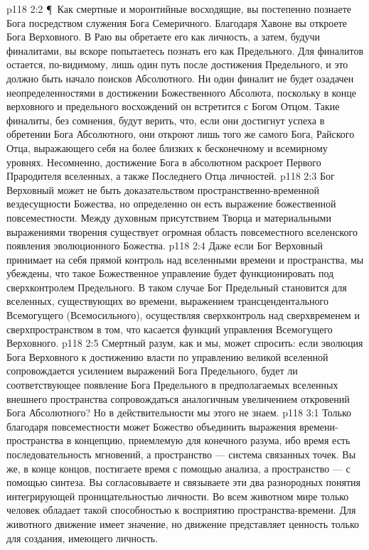 \vs p118 2:2 \P\ Как смертные и моронтийные восходящие, вы постепенно познаете Бога посредством служения Бога Семеричного. Благодаря Хавоне вы откроете Бога Верховного. В Раю вы обретаете его как личность, а затем, будучи финалитами, вы вскоре попытаетесь познать его как Предельного. Для финалитов остается, по\hyp{}видимому, лишь один путь после достижения Предельного, и это должно быть начало поисков Абсолютного. Ни один финалит не будет озадачен неопределенностями в достижении Божественного Абсолюта, поскольку в конце верховного и предельного восхождений он встретится с Богом Отцом. Такие финалиты, без сомнения, будут верить, что, если они достигнут успеха в обретении Бога Абсолютного, они откроют лишь того же самого Бога, Райского Отца, выражающего себя на более близких к бесконечному и всемирному уровнях. Несомненно, достижение Бога в абсолютном раскроет Первого Прародителя вселенных, а также Последнего Отца личностей.
\vs p118 2:3 Бог Верховный может не быть доказательством пространственно\hyp{}временной вездесущности Божества, но определенно он есть выражение божественной повсеместности. Между духовным присутствием Творца и материальными выражениями творения существует огромная область повсеместного  вселенского появления эволюционного Божества.
\vs p118 2:4 Даже если Бог Верховный принимает на себя прямой контроль над вселенными времени и пространства, мы убеждены, что такое Божественное управление будет функционировать под сверхконтролем Предельного. В таком случае Бог Предельный становится для вселенных, существующих во времени, выражением трансцендентального Всемогущего (Всемосильного), осуществляя сверхконтроль над сверхвременем и сверхпространством в том, что касается функций управления Всемогущего Верховного.
\vs p118 2:5 Смертный разум, как и мы, может спросить: если эволюция Бога Верховного к достижению власти по управлению великой вселенной сопровождается усилением выражений Бога Предельного, будет ли соответствующее появление Бога Предельного в предполагаемых вселенных внешнего пространства сопровождаться аналогичным увеличением откровений Бога Абсолютного? Но в действительности мы этого не знаем.
\vs p118 3:1 Только благодаря повсеместности может Божество объединить выражения времени\hyp{}пространства в концепцию, приемлемую для конечного разума, ибо время есть последовательность мгновений, а пространство --- система связанных точек. Вы же, в конце концов, постигаете время с помощью анализа, а пространство --- с помощью синтеза. Вы согласовываете и связываете эти два разнородных понятия интегрирующей проницательностью личности. Во всем животном мире только человек обладает такой способностью к восприятию пространства\hyp{}времени. Для животного движение имеет значение, но движение представляет ценность только для создания, имеющего личность.
